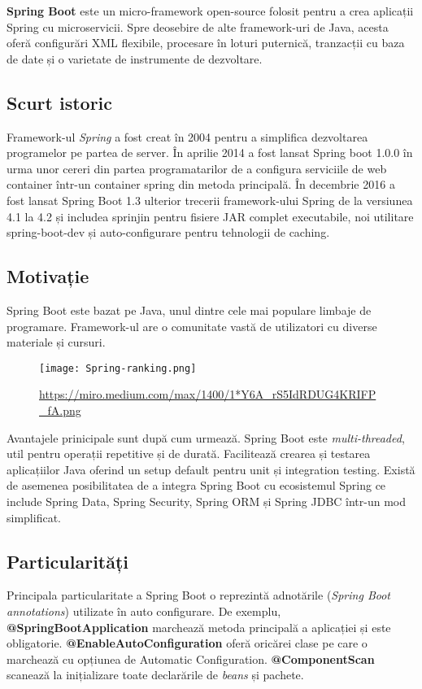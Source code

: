 \textbf{Spring Boot} este un micro-framework open-source folosit pentru a crea aplicații Spring cu microservicii. Spre deosebire de alte framework-uri de Java, acesta oferă configurări XML flexibile, 
procesare în loturi puternică, tranzacții cu baza de date și o varietate de instrumente de dezvoltare.

\subsection{Scurt istoric}
Framework-ul \textit{Spring} a fost creat în 2004 pentru a simplifica dezvoltarea programelor pe partea de server. În aprilie 2014 a fost lansat Spring boot 1.0.0 în urma unor cereri din partea programatarilor de a configura serviciile de web container într-un container spring din metoda principală. În decembrie 2016 a fost lansat Spring Boot 1.3 ulterior trecerii framework-ului Spring de la versiunea 4.1 la 4.2 și includea sprinjin pentru fisiere JAR complet executabile, noi utilitare spring-boot-dev și auto-configurare pentru tehnologii de caching. 

\subsection{Motivație}
Spring Boot este bazat pe Java, unul dintre cele mai populare limbaje de programare. Framework-ul are o comunitate vastă de utilizatori cu diverse materiale și cursuri.

\begin{figure}[H]
	\centering
	\texttt{[image: Spring-ranking.png]}
	\caption{\url{https://miro.medium.com/max/1400/1*Y6A_rS5IdRDUG4KRIFP_fA.png}}
\end{figure}

Avantajele prinicipale sunt după cum urmează. Spring Boot este \textit{multi-threaded}, util pentru operații repetitive și de durată. Facilitează crearea și testarea aplicațiilor Java oferind un setup default pentru unit și integration testing. Există de asemenea posibilitatea de a integra Spring Boot cu ecosistemul Spring ce include Spring Data, Spring Security, Spring ORM și Spring JDBC într-un mod simplificat.

\subsection{Particularități}
Principala particularitate a Spring Boot o reprezintă adnotările (\textit{Spring Boot annotations}) utilizate în auto configurare.
De exemplu, \textbf{@SpringBootApplication} marchează metoda principală a aplicației și este obligatorie.
\textbf{@EnableAutoConfiguration} oferă oricărei clase pe care o marchează cu opțiunea de Automatic Configuration.
\textbf{@ComponentScan} scanează la inițializare toate declarările de \textit{beans} și pachete.

